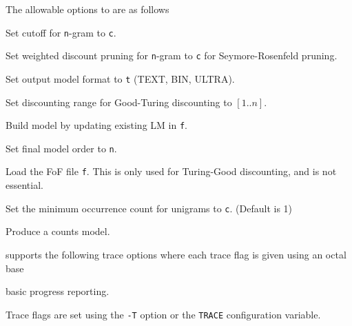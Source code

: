 The allowable options to  are as follows

\begin{optlist}
   Set cutoff for \texttt{n}-gram to \texttt{c}.

   Set weighted discount pruning for \texttt{n}-gram
                   to \texttt{c} for Seymore-Rosenfeld pruning.

   Set output model format to \texttt{t} (TEXT, BIN, ULTRA).

   Set discounting range for Good-Turing discounting to
                $[1..n]$.

   Build model by updating existing LM in \texttt{f}.

   Set final model order to \texttt{n}.

   Load the FoF file \texttt{f}. This is only used for
	         Turing-Good discounting, and is not essential.

   Set the minimum occurrence count for unigrams to
	        \texttt{c}.  (Default is 1)

   Produce a counts model.
\end{optlist}



 supports the following trace options where each
trace flag is given using an octal base
\begin{optlist}

  basic progress reporting. 
\end{optlist}
Trace flags are set using the \texttt{-T} option or the  \texttt{TRACE} 
configuration variable.





